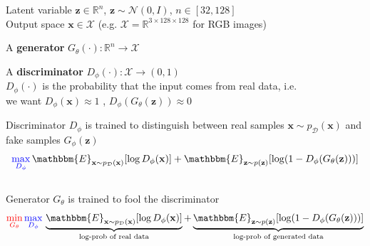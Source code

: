 \documentclass{beamer}
\let\tempone\itemize
\let\temptwo\enditemize
\renewenvironment{itemize}{\tempone\addtolength{\itemsep}{0.5\baselineskip}}{\temptwo}
\newcommand{\zvec}{\mathbf{z}}
\newcommand{\xvec}{\mathbf{x}}
\newcommand{\reals}{\ensuremath{\mathbb{R}}}
\begin{document}
\begin{frame}
\begin{center}

\end{center}
Latent variable $\zvec \in \reals^n$, $\zvec \sim \mathcal{N}(0, I)$, $n \in [32, 128]$\\
Output space $\xvec \in \mathcal{X}$ (e.g. $\mathcal{X} = \reals^{3 \times 128 \times 128}$ for RGB images)  \pause \\
\begin{itemize}
\item A \textbf{generator} $G_\theta(\cdot): \reals^n  \rightarrow \mathcal{X}$  \pause
\item A \textbf{discriminator} $D_\phi(\cdot): \mathcal{X} \rightarrow (0,1)$  \\
$D_\phi(\cdot)$ is the probability that the input comes from real data, i.e. \\
we want $D_\phi(\xvec) \approx 1$ , $ D_\phi(G_\theta(\zvec)) \approx 0$
\end{itemize}
\end{frame}

\begin{frame}
\begin{center}
\end{center}
Discriminator $D_\phi$ is trained to distinguish between real samples $\xvec \sim p_\mathcal{D}(\xvec)$ and fake samples $G_\phi(\zvec)$
\[ {\color{blue} \max_{D_\phi}} \, \mathbbm{E}_{\xvec \sim p_\mathcal{D}(\xvec) }[\log D_\phi(\xvec)]  + \mathbbm{E}_{\zvec \sim p(\zvec)} [\log (1 - D_\phi(G_\theta(\zvec))) ] \]
\\
\pause
Generator $G_\theta$ is trained to fool the discriminator
\[ {\color{red} \min_{G_\theta}} \, {\color{blue} \max_{D_\phi}} \, \underbrace{\mathbbm{E}_{\xvec \sim p_\mathcal{D}(\xvec) }[\log D_\phi(\xvec)]}_{\text{log-prob of real data}}  + \underbrace{\mathbbm{E}_{\zvec \sim p(\zvec)} [\log (1 - D_\phi(G_\theta(\zvec))) ]}_{\text{log-prob of generated data}} \]
\end{frame}
\end{document}
